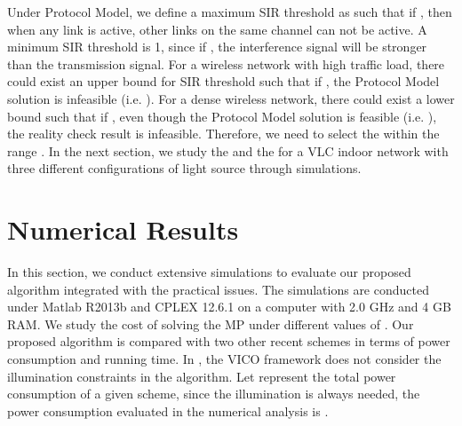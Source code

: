 \documentclass[10pt,journal]{IEEEtran}
\begin{document}
Under Protocol Model, we define a maximum SIR threshold as  such that if , then when any link is active, other links on the same channel can not be active. A minimum SIR threshold  is 1, since if , the interference signal will be stronger than the transmission signal. For a wireless network with high traffic load, there could exist an upper bound  for SIR threshold such that if , the Protocol Model solution is infeasible (i.e. ). For a dense wireless network, there could exist a lower bound  such that if , even though the Protocol Model solution is feasible (i.e. ), the reality check result is infeasible. Therefore, we need to select the  within the range . In the next section, we study the  and the  for a VLC indoor network with three different configurations of light source through simulations.



\section{Numerical Results}\label{numerical_analysis}
In this section, we conduct extensive simulations to evaluate our proposed algorithm integrated with the practical issues. The simulations are conducted under Matlab R2013b and CPLEX 12.6.1 \cite{cplex2014v12} on a computer with 2.0 GHz and 4 GB RAM. We study the cost of solving the MP under different values of . Our proposed algorithm is compared with two other recent schemes \cite{li2012vico,tao2015scheduling} in terms of power consumption and running time. In \cite{li2012vico}, the VICO framework does not consider the illumination constraints in the algorithm. Let  represent the total power consumption of a given scheme, since the illumination is always needed, the power consumption evaluated in the numerical analysis is .
\end{document}
